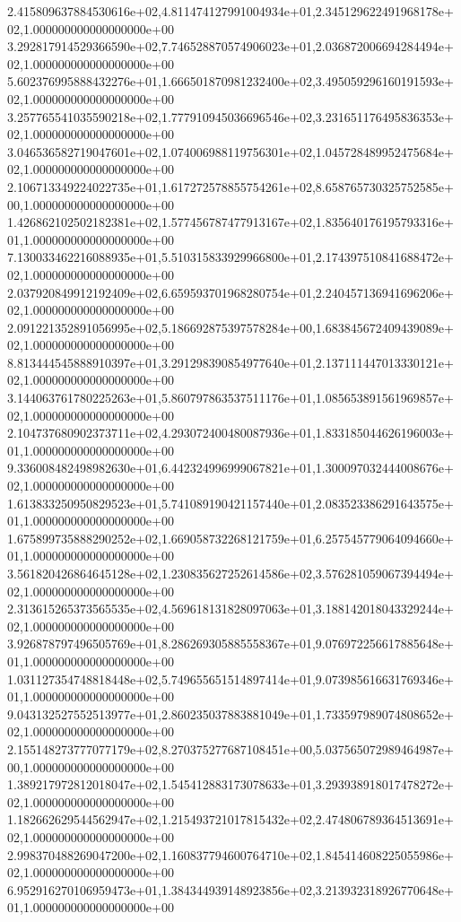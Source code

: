 2.415809637884530616e+02,4.811474127991004934e+01,2.345129622491968178e+02,1.000000000000000000e+00
3.292817914529366590e+02,7.746528870574906023e+01,2.036872006694284494e+02,1.000000000000000000e+00
5.602376995888432276e+01,1.666501870981232400e+02,3.495059296160191593e+02,1.000000000000000000e+00
3.257765541035590218e+02,1.777910945036696546e+02,3.231651176495836353e+02,1.000000000000000000e+00
3.046536582719047601e+02,1.074006988119756301e+02,1.045728489952475684e+02,1.000000000000000000e+00
2.106713349224022735e+01,1.617272578855754261e+02,8.658765730325752585e+00,1.000000000000000000e+00
1.426862102502182381e+02,1.577456787477913167e+02,1.835640176195793316e+01,1.000000000000000000e+00
7.130033462216088935e+01,5.510315833929966800e+01,2.174397510841688472e+02,1.000000000000000000e+00
2.037920849912192409e+02,6.659593701968280754e+01,2.240457136941696206e+02,1.000000000000000000e+00
2.091221352891056995e+02,5.186692875397578284e+00,1.683845672409439089e+02,1.000000000000000000e+00
8.813444545888910397e+01,3.291298390854977640e+01,2.137111447013330121e+02,1.000000000000000000e+00
3.144063761780225263e+01,5.860797863537511176e+01,1.085653891561969857e+02,1.000000000000000000e+00
2.104737680902373711e+02,4.293072400480087936e+01,1.833185044626196003e+01,1.000000000000000000e+00
9.336008482498982630e+01,6.442324996999067821e+01,1.300097032444008676e+02,1.000000000000000000e+00
1.613833250950829523e+01,5.741089190421157440e+01,2.083523386291643575e+01,1.000000000000000000e+00
1.675899735888290252e+02,1.669058732268121759e+01,6.257545779064094660e+01,1.000000000000000000e+00
3.561820426864645128e+02,1.230835627252614586e+02,3.576281059067394494e+02,1.000000000000000000e+00
2.313615265373565535e+02,4.569618131828097063e+01,3.188142018043329244e+02,1.000000000000000000e+00
3.926878797496505769e+01,8.286269305885558367e+01,9.076972256617885648e+01,1.000000000000000000e+00
1.031127354748818448e+02,5.749655651514897414e+01,9.073985616631769346e+01,1.000000000000000000e+00
9.043132527552513977e+01,2.860235037883881049e+01,1.733597989074808652e+02,1.000000000000000000e+00
2.155148273777077179e+02,8.270375277687108451e+00,5.037565072989464987e+00,1.000000000000000000e+00
1.389217972812018047e+02,1.545412883173078633e+01,3.293938918017478272e+02,1.000000000000000000e+00
1.182662629544562947e+02,1.215493721017815432e+02,2.474806789364513691e+02,1.000000000000000000e+00
2.998370488269047200e+02,1.160837794600764710e+02,1.845414608225055986e+02,1.000000000000000000e+00
6.952916270106959473e+01,1.384344939148923856e+02,3.213932318926770648e+01,1.000000000000000000e+00
